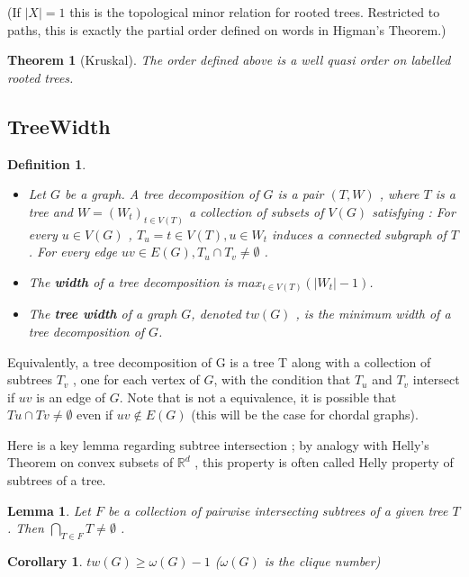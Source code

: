 \documentclass[12pt,a4paper]{article}
\def\R{\mathbb{R}}
\newtheorem{theorem}{Theorem}
\newtheorem{corollary}{Corollary}
\newtheorem{lemma}{Lemma}
\newtheorem{definition}{Definition}
\begin{document}
(If $| X | = 1$ this is the topological minor relation for rooted trees. Restricted to
paths, this is exactly the partial order defined on words in Higman’s Theorem.)

\begin{theorem}[Kruskal]
The order defined above is a well quasi order on labelled rooted trees.
\end{theorem}


\subsection{TreeWidth}

\begin{definition}
\begin{itemize}
\item Let $G$ be a graph. A tree decomposition of $G$ is a pair $( T , W )$ , where $T$ is a
tree and $W = ( W_t )_{t \in V ( T )}$ a collection of subsets of $V ( G )$ satisfying :
For every $u \in V ( G )$ , $T_u = { t \in V ( T ) , u \in W_t }$ induces a connected subgraph of
$T$ .
For every edge $uv \in E ( G ) , T_u \cap T_v \neq \emptyset$ .
\item The \textbf{width} of a tree decomposition is $max_{t \in V ( T )}(| W_t | − 1 )$.
\item The \textbf{tree width} of a graph $G$, denoted $tw ( G )$ , is the minimum width of a tree
decomposition of $G$.
\end{itemize}
\end{definition}

Equivalently, a tree decomposition of G is a tree T along with a collection of
subtrees $T_v$ , one for each vertex of $G$, with the condition that $T_u$ and $T_v$ intersect if
$uv$ is an edge of $G$. Note that is not a equivalence, it is possible that $T u \cap T v \neq \emptyset$
even if $uv \notin E ( G )$ (this will be the case for chordal graphs).

Here is a key lemma regarding subtree intersection ; by analogy with Helly’s
Theorem on convex subsets of $\R ^ d$ , this property is often called Helly property of
subtrees of a tree.

\begin{lemma}
Let $F$ be a collection of pairwise intersecting subtrees of a given tree $T$ . Then
$\bigcap_{T \in F} T \neq \emptyset$ .
\end{lemma}

\begin{corollary}
$tw( G ) \geq \omega( G ) - 1$  ($\omega( G )$ is the clique number)
\end{corollary}
\end{document}

